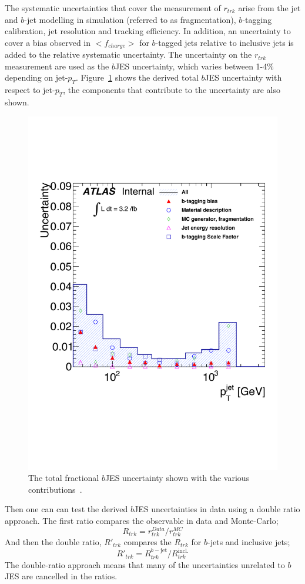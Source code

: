 The systematic uncertainties that cover the measurement of $r_{trk}$
arise from the jet and $b$-jet modelling in simulation (referred to as fragmentation),
$b$-tagging calibration, jet resolution and tracking efficiency.
In addition, an uncertainty to cover a bias observed in $<f_{charge}>$ for $b$-tagged jets relative to inclusive jets is added to the relative systematic uncertainty.
The uncertainty on the $r_{trk}$ measurement are used as the $b$JES uncertainty, which varies between 1-4\% depending on jet-$p_T$.
Figure~\ref{fig:obj-bjets_bJES_uncert} shows the derived total $b$JES uncertainty with respect to jet-$p_T$,
the components that contribute to the uncertainty are also shown.
\begin{figure}[!ht]
  \captionsetup[subfigure]{aboveskip=-5pt,justification=centering}
  \begin{center}
    \includegraphics[width=0.6\linewidth, angle=0]{figs/Objects/bjets_bJES_uncert_edit.pdf}
  \end{center}
  \caption[The total fractional $b$JES uncertainty shown with the various contributions.]
          {The total fractional $b$JES uncertainty shown with the various contributions~\cite{dibjet-int_mori16}.}
          \label{fig:obj-bjets_bJES_uncert}
\end{figure}

Then one can can test the derived $b$JES uncertainties in data using a double ratio approach.
The first ratio compares the observable in data and Monte-Carlo;
\begin{equation} 
  R_{trk} = r_{trk}^{Data}/r_{trk}^{MC}
\end{equation}
And then the double ratio, $R'_{trk}$ compares the $R_{trk}$ for $b$-jets and inclusive jets;
\begin{equation} 
  R'_{trk} = R_{trk}^{b-\text{jet}}/R_{trk}^{\text{incl.}}
\end{equation}
The double-ratio approach means that many of the uncertainties unrelated to $b$JES are cancelled in the ratios.

